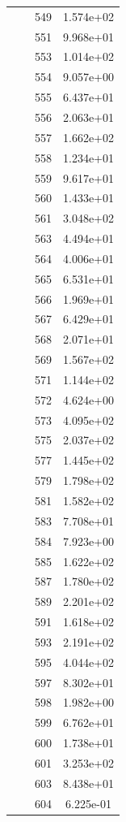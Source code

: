 \documentclass[12pt]{article}
\begin{document}
\begin{longtable}{@{}cccc@{}}
 &  & 549 & 1.574e+02 \\
 &  & 551 & 9.968e+01 \\
 &  & 553 & 1.014e+02 \\
 &  & 554 & 9.057e+00 \\
 &  & 555 & 6.437e+01 \\
 &  & 556 & 2.063e+01 \\
 &  & 557 & 1.662e+02 \\
 &  & 558 & 1.234e+01 \\
 &  & 559 & 9.617e+01 \\
 &  & 560 & 1.433e+01 \\
 &  & 561 & 3.048e+02 \\
 &  & 563 & 4.494e+01 \\
 &  & 564 & 4.006e+01 \\
 &  & 565 & 6.531e+01 \\
 &  & 566 & 1.969e+01 \\
 &  & 567 & 6.429e+01 \\
 &  & 568 & 2.071e+01 \\
 &  & 569 & 1.567e+02 \\
 &  & 571 & 1.144e+02 \\
 &  & 572 & 4.624e+00 \\
 &  & 573 & 4.095e+02 \\
 &  & 575 & 2.037e+02 \\
 &  & 577 & 1.445e+02 \\
 &  & 579 & 1.798e+02 \\
 &  & 581 & 1.582e+02 \\
 &  & 583 & 7.708e+01 \\
 &  & 584 & 7.923e+00 \\
 &  & 585 & 1.622e+02 \\
 &  & 587 & 1.780e+02 \\
 &  & 589 & 2.201e+02 \\
 &  & 591 & 1.618e+02 \\
 &  & 593 & 2.191e+02 \\
 &  & 595 & 4.044e+02 \\
 &  & 597 & 8.302e+01 \\
 &  & 598 & 1.982e+00 \\
 &  & 599 & 6.762e+01 \\
 &  & 600 & 1.738e+01 \\
 &  & 601 & 3.253e+02 \\
 &  & 603 & 8.438e+01 \\
 &  & 604 & 6.225e-01 \\

\end{longtable}
\end{document}

